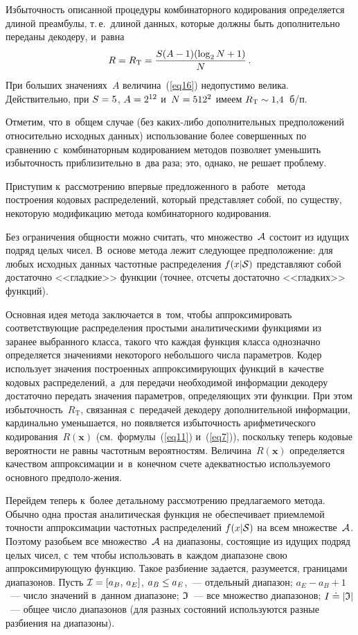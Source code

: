 \begin{multicols}{2}
Избыточность описанной процедуры комбинаторного кодирования определяется 
длиной преамбулы, т.\,е.\ длиной данных, которые должны быть дополнительно 
переданы декодеру, и~равна
\begin{equation}
\label{eq16}
R = R_{\mathrm{T}} = \displaystyle\frac{\displaystyle S(A-1)(\log_{2}N+1)\mathstrut}{\displaystyle N\mathstrut}\,.
\end{equation}
При больших значениях~$A$ величина~(\ref{eq16}) не\-до\-пус\-ти\-мо велика. 
Действительно, при $S\hm=5$, $A\hm=2^{12}$ и~$N\hm=512^2$ имеем 
$R_{\mathrm{T}}\hm\sim1{,}4$~б/п.

Отметим, что в~общем случае (без ка\-ких-ли\-бо 
дополнительных предположений относительно исходных данных) использование 
более совершенных по сравнению с~комбинаторным кодированием методов 
позволяет уменьшить избыточность приблизительно в~два раза; это, 
однако, не решает проблему.

Приступим к~рассмотрению впервые предложенного в~работе~\cite{b01} метода 
построения кодовых распределений, который представляет собой, по существу, 
некоторую модификацию метода комбинаторного кодирования.

 Без ограничения 
общности можно считать, что множество~${\cal A}$ состоит из идущих подряд 
целых чисел. В~основе метода лежит следующее предположение: для любых исходных 
данных частотные распределения $f(x|{\cal S})$ представляют собой достаточно 
<<гладкие>> функции (точнее, отсчеты достаточно <<гладких>> функций). 


Основная идея метода заключается в~том, чтобы аппроксимировать соответствующие 
распределения простыми аналитическими функциями из зара\-нее выбранного класса, 
такого что каждая функция класса однозначно определяется значениями 
некоторого небольшого числа параметров. 
Кодер использует значения построенных аппроксимирующих функций в~качестве 
кодовых распределений, а~для передачи необходимой информации декодеру 
достаточно передать значения параметров, определяющих эти функции. При этом 
избыточность~$R_{\mathrm{T}}$, связанная с~передачей декодеру дополнительной 
информации, кардинально уменьшается, но появляется избыточность 
арифметического кодирования~$R(\mathbf{x})$ (см.\ формулы~(\ref{eq11}) и~(\ref{eq7})), 
поскольку теперь кодовые вероятности не равны частотным вероятностям. 
Величина~$R(\mathbf{x})$ определяется качеством аппроксимации 
и~в~конечном счете адекватностью используемого основного предполо-\linebreak жения.

Перейдем теперь к~более детальному рассмотрению предлагаемого метода. 
Обычно одна простая аналитическая функция не обеспечивает приемлемой 
точ\-ности аппроксимации частотных распределений $f(x|{\cal S})$  
на всем множестве~${\cal A}$. Поэтому разобьем все множество~${\cal A}$ 
на диапазоны, состоящие из идущих подряд целых чисел, с~тем чтобы использовать в~каждом 
диапазоне свою аппроксимирующую функцию. Такое разбиение задается, разумеется, 
границами диапазонов. Пусть ${\cal I}\hm=[a_B,\,a_E]$, $a_B\hm\le a_E$,~--- 
отдельный диапазон; $a_E-a_B+1$~--- чис\-ло значений в~данном диапазоне; 
${\frak I}$~--- все множество диапазонов; $I\doteq |{\frak I}|$~--- 
общее число диапазонов (для разных состояний используются разные разбиения 
на диапазоны).


\end{multicols}
